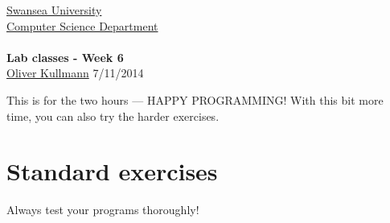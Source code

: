 \documentclass[11pt]{article}
\newcommand{\Java}{\lstset{language=Java,keywordstyle=\bfseries,breaklines,breakindent=30pt}}
\begin{document}
\begin{center}
  \href{http://www.swan.ac.uk/}{Swansea University}\\
  \href{http://www.swan.ac.uk/compsci/}{Computer Science Department}\\[1ex]
  \href{\chp}{\module}\\[1ex]
  \textbf{Lab classes - Week 6}\\
  \href{http://cs.swan.ac.uk/~csoliver}{Oliver Kullmann} 7/11/2014
\end{center}


This is for the two hours --- HAPPY PROGRAMMING! With this bit more time, you can also try the harder exercises.

\section{Standard exercises}
\label{sec:stdex}

\Java

Always test your programs thoroughly!
\end{document}
